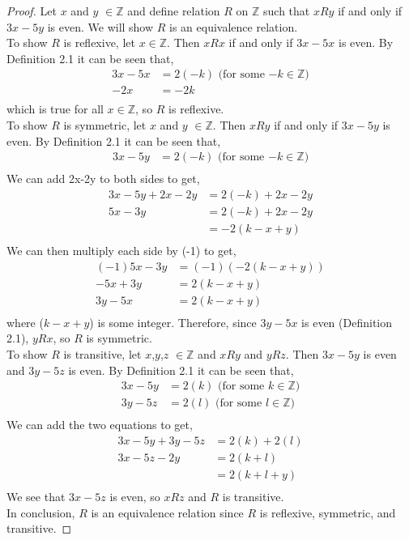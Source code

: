 \documentclass[12pt]{article}
\begin{document}
	\begin{proof}
	Let $x$ and $y$ $\in \mathbb{Z}$ and define relation $R$ on $\mathbb{Z}$ such that $xRy$ if and only if $3x-5y$ is even. We will show $R$ is an equivalence relation.\\

	To show $R$ is reflexive, let $x \in \mathbb{Z}$. Then $xRx$ if and only if $3x-5x$ is even. By Definition 2.1 it can be seen that,
	\begin{align*}
		3x-5x &= 2(-k) \text{ (for some $-k \in \mathbb{Z}$)}\\
		-2x &= -2k\\
	\end{align*}
	which is true for all $x \in \mathbb{Z}$, so $R$ is reflexive.\\

	To show $R$ is symmetric, let $x$ and $y$ $\in \mathbb{Z}$. Then $xRy$ if and only if $3x-5y$ is even. By Definition 2.1 it can be seen that,
	\begin{align*}
		3x-5y &= 2(-k) \text{ (for some $-k \in \mathbb{Z}$)}\\
	\end{align*}
	We can add 2x-2y to both sides to get,
	\begin{align*}
		3x-5y + 2x-2y &= 2(-k) + 2x-2y\\
		5x-3y &= 2(-k) + 2x-2y\\
		      &= -2(k-x+y)\\
	\end{align*}
	We can then multiply each side by (-1) to get,
	\begin{align*}
		(-1)5x-3y &= (-1)(-2(k-x+y))\\
		-5x+3y&= 2(k-x+y)\\
		3y-5x &= 2(k-x+y)\\
	\end{align*}
	where ($k-x+y$) is some integer. Therefore, since $3y-5x$ is even (Definition 2.1), $yRx$, so
	$R$ is symmetric.\\

	To show $R$ is transitive, let $x$,$y$,$z$ $\in \mathbb{Z}$ and $xRy$ and $yRz$. 
	Then $3x-5y$ is even and $3y-5z$ is even. By Definition 2.1 it can be seen that,
	\begin{align*}
		3x-5y &= 2(k) \text{ (for some $k \in \mathbb{Z}$)}\\
		3y-5z &= 2(l) \text{ (for some $l \in \mathbb{Z}$)}\\
	\end{align*}
	We can add the two equations to get,
	\begin{align*}
		3x-5y + 3y-5z &= 2(k) + 2(l)\\
		3x-5z - 2y &= 2(k+l)\\
			   &= 2(k+l+y)\\
	\end{align*}
	We see that $3x-5z$ is even, so $xRz$ and $R$ is transitive.\\

	In conclusion, $R$ is an equivalence relation since $R$ is reflexive, symmetric, and transitive.
\end{proof}
	
\end{document}
